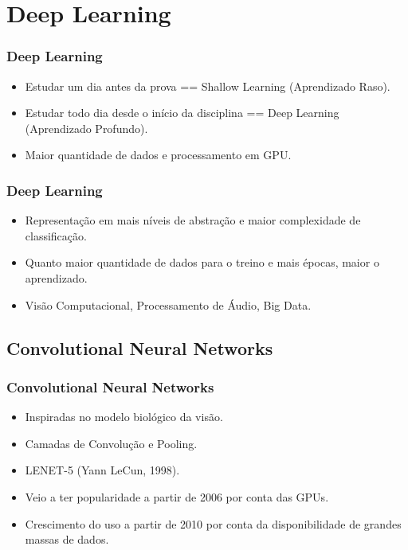 \documentclass{beamer}
\begin{document}
\section{Deep Learning}

\begin{frame}
\frametitle{Deep Learning}
\begin{itemize}
\item Estudar um dia antes da prova == Shallow Learning (Aprendizado Raso).
\item Estudar todo dia desde o início da disciplina == Deep Learning (Aprendizado Profundo).
\item Maior quantidade de dados e processamento em GPU.
\end{itemize}
\end{frame}

\begin{frame}
\frametitle{Deep Learning}
\begin{itemize}
\item Representação em mais níveis de abstração e maior complexidade de classificação.
\item Quanto maior quantidade de dados para o treino e mais épocas, maior o aprendizado.
\item Visão Computacional, Processamento de Áudio, Big Data.
\end{itemize}
\end{frame}

\subsection{Convolutional Neural Networks}

\begin{frame}
\frametitle{Convolutional Neural Networks}
\begin{itemize}
\item Inspiradas no modelo biológico da visão.
\item Camadas de Convolução e Pooling.
\item LENET-5 (Yann LeCun, 1998).
\item Veio a ter popularidade a partir de 2006 por conta das GPUs.
\item Crescimento do uso a partir de 2010 por conta da disponibilidade de grandes massas de dados.
\end{itemize}
\end{frame}
\end{document}
